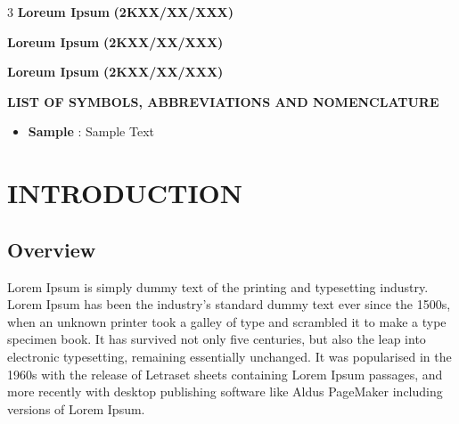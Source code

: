 \documentclass[12pt,a4paper]{report}
\begin{document}
\vspace{2 cm}                        
\begin{multicols}{3}
\centering
\textbf{Loreum Ipsum}
\textbf{(2KXX/XX/XXX)}\\
\vspace{0.3cm}


\textbf{Loreum Ipsum}
\textbf{(2KXX/XX/XXX)}\\
\vspace{0.3cm}


\textbf{Loreum Ipsum}
\textbf{(2KXX/XX/XXX)}\\
\vspace{0.3cm}
\end{multicols}

\tableofcontents %
\newpage
\listoftables


\newpage
\listoffigures
{}



\newpage
\begin{center}
  \textbf{LIST OF SYMBOLS, ABBREVIATIONS AND NOMENCLATURE} 
  \end{center}

\begin{itemize}
  \item[]\textbf{ Sample}  : Sample Text
\end{itemize}

\vspace{2cm}
\begin{center}
  \end{center}


\newpage

\chapter{ INTRODUCTION}
\section{Overview}
Lorem Ipsum is simply dummy text of the printing and typesetting industry. Lorem Ipsum has been the industry's standard dummy text ever since the 1500s, when an unknown printer took a galley of type and scrambled it to make a type specimen book. It has survived not only five centuries, but also the leap into electronic typesetting, remaining essentially unchanged. It was popularised in the 1960s with the release of Letraset sheets containing Lorem Ipsum passages, and more recently with desktop publishing software like Aldus PageMaker including versions of Lorem Ipsum.
\end{document}
